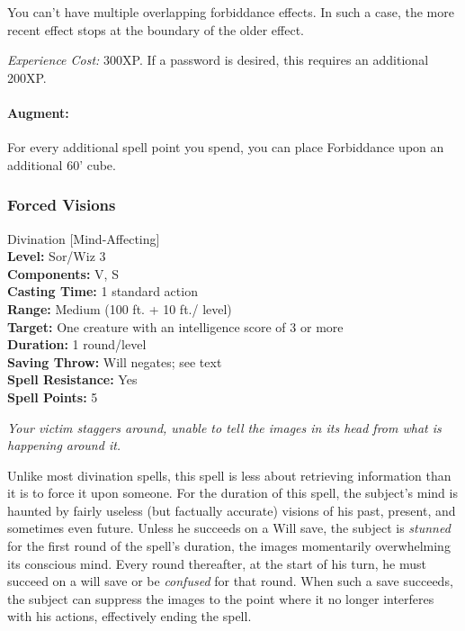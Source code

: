 You can't have multiple overlapping forbiddance effects. 
In such a case, the more recent effect stops at the boundary of the older effect.

\emph{Experience Cost:} 300XP. If a password is desired, this requires an additional 200XP.

\paragraph{Augment:} For every additional spell point you spend, you can place Forbiddance upon an additional 60' cube.
\subsubsection{Forced Visions}
\label{Spell:ForcedVisions}
Divination [Mind-Affecting]
\\ \textbf{Level:} Sor/Wiz 3
\\ \textbf{Components:} V, S
\\ \textbf{Casting Time:} 1 standard action
\\ \textbf{Range:} Medium (100 ft. + 10 ft./ level)
\\ \textbf{Target:} One creature with an intelligence score of 3 or more
\\ \textbf{Duration:} 1 round/level
\\ \textbf{Saving Throw:} Will negates; see text
\\ \textbf{Spell Resistance:} Yes
\\ \textbf{Spell Points:} 5

\emph{Your victim staggers around, unable to tell the images in its head from what is happening around it.}

Unlike most divination spells, this spell is less about retrieving information than it is to force it upon someone.
For the duration of this spell, the subject's mind is haunted by fairly useless (but factually accurate) 
visions of his past, present, and sometimes even future.
Unless he succeeds on a Will save, the subject is \emph{stunned} for the first round of the spell's duration, the images
momentarily overwhelming its conscious mind. Every round thereafter, at the start of his turn, he must succeed on a will save or be \emph{confused} for that round. 
When such a save succeeds, the subject can suppress the images to the point where it no
longer interferes with his actions, effectively ending the spell.

